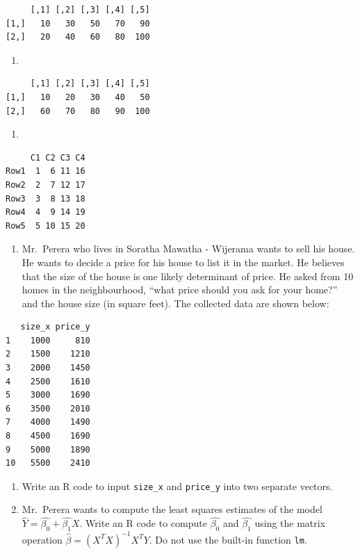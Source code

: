 \documentclass[
  letterpaper,
  DIV=11,
  numbers=noendperiod]{scrreprt}
\providecommand{\tightlist}{%
  \setlength{\itemsep}{0pt}\setlength{\parskip}{0pt}}\usepackage{longtable,booktabs,array}
\begin{document}
\begin{verbatim}
     [,1] [,2] [,3] [,4] [,5]
[1,]   10   30   50   70   90
[2,]   20   40   60   80  100
\end{verbatim}

\begin{enumerate}
\def\labelenumi{\alph{enumi}.}
\setcounter{enumi}{1}
\tightlist
\item
\end{enumerate}

\begin{verbatim}
     [,1] [,2] [,3] [,4] [,5]
[1,]   10   20   30   40   50
[2,]   60   70   80   90  100
\end{verbatim}

\begin{enumerate}
\def\labelenumi{\alph{enumi}.}
\setcounter{enumi}{2}
\tightlist
\item
\end{enumerate}

\begin{verbatim}
     C1 C2 C3 C4
Row1  1  6 11 16
Row2  2  7 12 17
Row3  3  8 13 18
Row4  4  9 14 19
Row5  5 10 15 20
\end{verbatim}

\begin{enumerate}
\def\labelenumi{\arabic{enumi}.}
\setcounter{enumi}{1}
\tightlist
\item
  Mr.~Perera who lives in Soratha Mawatha - Wijerama wants to sell his
  house. He wants to decide a price for his house to list it in the
  market. He believes that the size of the house is one likely
  determinant of price. He asked from 10 homes in the neighbourhood,
  ``what price should you ask for your home?'' and the house size (in
  square feet). The collected data are shown below:
\end{enumerate}

\begin{verbatim}
   size_x price_y
1    1000     810
2    1500    1210
3    2000    1450
4    2500    1610
5    3000    1690
6    3500    2010
7    4000    1490
8    4500    1690
9    5000    1890
10   5500    2410
\end{verbatim}

\begin{enumerate}
\def\labelenumi{(\alph{enumi})}
\item
  Write an R code to input \texttt{size\_x} and \texttt{price\_y} into
  two separate vectors.
\item
  Mr.~Perera wants to compute the least squares estimates of the model
  \(\hat{Y} = \hat{\beta_0} + \hat{\beta_1}X\). Write an R code to
  compute \(\hat{\beta_0}\) and \(\hat{\beta_1}\) using the matrix
  operation \(\hat{\beta} = (X^TX)^{-1}X^TY\). Do not use the built-in
  function \texttt{lm}.
\end{enumerate}
\end{document}
